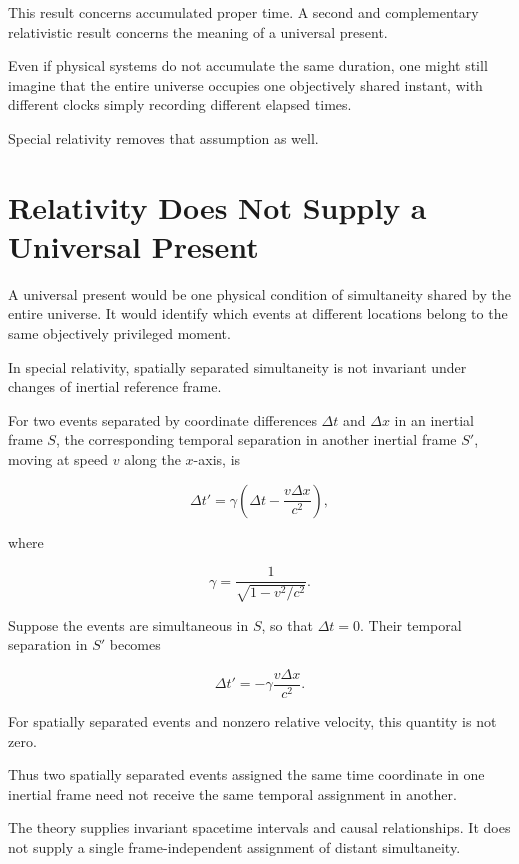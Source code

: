 \documentclass[12pt,onecolumn]{article}
\begin{document}
This result concerns accumulated proper time. A second and complementary relativistic result concerns the meaning of a universal present.

Even if physical systems do not accumulate the same duration, one might still imagine that the entire universe occupies one objectively shared instant, with different clocks simply recording different elapsed times.

Special relativity removes that assumption as well.

\section{Relativity Does Not Supply a Universal Present}

A universal present would be one physical condition of simultaneity shared by the entire universe. It would identify which events at different locations belong to the same objectively privileged moment.

In special relativity, spatially separated simultaneity is not invariant under changes of inertial reference frame.

For two events separated by coordinate differences \(\Delta t\) and \(\Delta x\) in an inertial frame \(S\), the corresponding temporal separation in another inertial frame \(S'\), moving at speed \(v\) along the \(x\)-axis, is

\begin{equation}
\Delta t'
=
\gamma
\left(
\Delta t-\frac{v\Delta x}{c^2}
\right),
\end{equation}

where

\begin{equation}
\gamma
=
\frac{1}{\sqrt{1-v^2/c^2}}.
\end{equation}

Suppose the events are simultaneous in \(S\), so that \(\Delta t=0\). Their temporal separation in \(S'\) becomes

\begin{equation}
\Delta t'
=
-\gamma\frac{v\Delta x}{c^2}.
\end{equation}

For spatially separated events and nonzero relative velocity, this quantity is not zero.

Thus two spatially separated events assigned the same time coordinate in one inertial frame need not receive the same temporal assignment in another.

The theory supplies invariant spacetime intervals and causal relationships. It does not supply a single frame-independent assignment of distant simultaneity.
\end{document}
